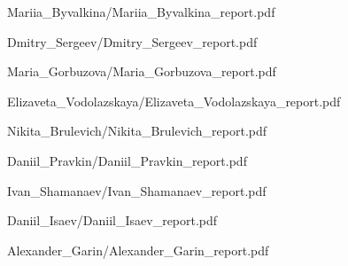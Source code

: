 \documentclass[a4paper]{article}
\begin{document}
{Mariia_Byvalkina/Mariia_Byvalkina_report.pdf}

{Dmitry_Sergeev/Dmitry_Sergeev_report.pdf}

{Maria_Gorbuzova/Maria_Gorbuzova_report.pdf}

{Elizaveta_Vodolazskaya/Elizaveta_Vodolazskaya_report.pdf}

{Nikita_Brulevich/Nikita_Brulevich_report.pdf}

{Daniil_Pravkin/Daniil_Pravkin_report.pdf}

{Ivan_Shamanaev/Ivan_Shamanaev_report.pdf}

{Daniil_Isaev/Daniil_Isaev_report.pdf}

{Alexander_Garin/Alexander_Garin_report.pdf}
\end{document}
